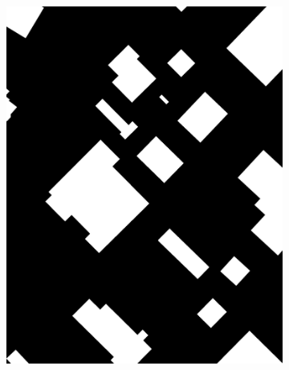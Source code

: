 \begin{figure}[htb]
\begin{subfigure}{0.19\textwidth}
  \includegraphics[width=1\linewidth]{fig/vai/32_osm.jpg}
\end{subfigure}
\begin{subfigure}{0.19\textwidth}
  \centering

\end{subfigure}
\end{figure}
